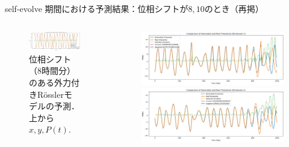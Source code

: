 \begin{frame}{self-evolve 期間における予測結果：位相シフトが$8, 10$のとき（再掲）}
\begin{columns}[T]
\begin{column}{.5\textwidth}
\begin{figure}
          \vspace{.5em}
          \begin{minipage}[c][.27\textheight][c]{\linewidth}
            \centering
            \includegraphics[width=0.7\linewidth]{Fig/8.p.png}
            \caption{\scriptsize{位相シフト（8時間分）のある外力付きRösslerモデルの予測．上から $x, y, P(t)$. }}
          \end{minipage}
        \end{figure}
      \end{column}
      \begin{column}{.5\textwidth}
        \begin{figure}
          \vspace{-.5cm}
          \begin{minipage}[c][.27\textheight][c]{\linewidth}
            \centering
            \includegraphics[width=0.7\linewidth]{Fig/10.x.png}
          \end{minipage}
      
          \vspace{-.5em}
  
          \begin{minipage}[c][.27\textheight][c]{\linewidth}
            \centering
            \includegraphics[width=0.7\linewidth]{Fig/10.y.png}
          \end{minipage}
          

\end{figure}
\end{column}
\end{columns}
\end{frame}
